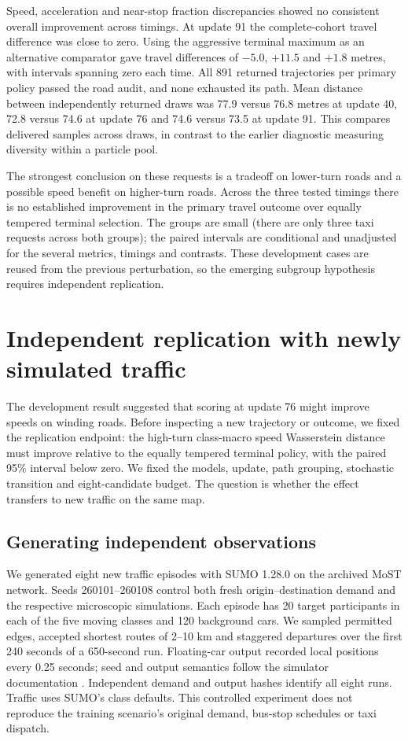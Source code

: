 Speed, acceleration and near-stop fraction discrepancies showed no consistent overall improvement across timings. At update 91 the complete-cohort travel difference was close to zero. Using the aggressive terminal maximum as an alternative comparator gave travel differences of $-5.0$, $+11.5$ and $+1.8$ metres, with intervals spanning zero each time. All 891 returned trajectories per primary policy passed the road audit, and none exhausted its path. Mean distance between independently returned draws was 77.9 versus 76.8 metres at update 40, 72.8 versus 74.6 at update 76 and 74.6 versus 73.5 at update 91. This compares delivered samples across draws, in contrast to the earlier diagnostic measuring diversity within a particle pool.

The strongest conclusion on these requests is a tradeoff on lower-turn roads and a possible speed benefit on higher-turn roads. Across the three tested timings there is no established improvement in the primary travel outcome over equally tempered terminal selection. The groups are small (there are only three taxi requests across both groups); the paired intervals are conditional and unadjusted for the several metrics, timings and contrasts. These development cases are reused from the previous perturbation, so the emerging subgroup hypothesis requires independent replication.

\section{Independent replication with newly simulated traffic}
\label{sec:independent-sumo}
The development result suggested that scoring at update 76 might improve speeds on winding roads. Before inspecting a new trajectory or outcome, we fixed the replication endpoint: the high-turn class-macro speed Wasserstein distance must improve relative to the equally tempered terminal policy, with the paired 95\% interval below zero. We fixed the models, update, path grouping, stochastic transition and eight-candidate budget. The question is whether the effect transfers to new traffic on the same map.

\subsection{Generating independent observations}
We generated eight new traffic episodes with SUMO 1.28.0 on the archived MoST network. Seeds 260101--260108 control both fresh origin--destination demand and the respective microscopic simulations. Each episode has 20 target participants in each of the five moving classes and 120 background cars. We sampled permitted edges, accepted shortest routes of 2--10 km and staggered departures over the first 240 seconds of a 650-second run. Floating-car output recorded local positions every 0.25 seconds; seed and output semantics follow the simulator documentation \cite{sumodocs}. Independent demand and output hashes identify all eight runs. Traffic uses SUMO's class defaults. This controlled experiment does not reproduce the training scenario's original demand, bus-stop schedules or taxi dispatch.

